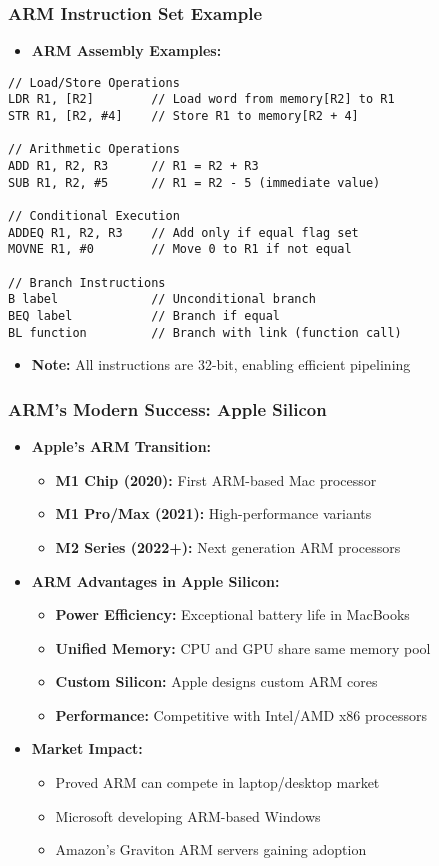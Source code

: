 \begin{frame}[fragile]
\frametitle{ARM Instruction Set Example}
\begin{itemize}
    \item \textbf{ARM Assembly Examples:}
\end{itemize}
\begin{verbatim}
// Load/Store Operations
LDR R1, [R2]        // Load word from memory[R2] to R1
STR R1, [R2, #4]    // Store R1 to memory[R2 + 4]

// Arithmetic Operations  
ADD R1, R2, R3      // R1 = R2 + R3
SUB R1, R2, #5      // R1 = R2 - 5 (immediate value)

// Conditional Execution
ADDEQ R1, R2, R3    // Add only if equal flag set
MOVNE R1, #0        // Move 0 to R1 if not equal

// Branch Instructions
B label             // Unconditional branch
BEQ label           // Branch if equal
BL function         // Branch with link (function call)
\end{verbatim}
\begin{itemize}
    \item \textbf{Note:} All instructions are 32-bit, enabling efficient pipelining
\end{itemize}
\end{frame}

\begin{frame}
\frametitle{ARM's Modern Success: Apple Silicon}
\begin{itemize}
    \item \textbf{Apple's ARM Transition:}
    \begin{itemize}
        \item \textbf{M1 Chip (2020):} First ARM-based Mac processor
        \item \textbf{M1 Pro/Max (2021):} High-performance variants
        \item \textbf{M2 Series (2022+):} Next generation ARM processors
    \end{itemize}
    \item \textbf{ARM Advantages in Apple Silicon:}
    \begin{itemize}
        \item \textbf{Power Efficiency:} Exceptional battery life in MacBooks
        \item \textbf{Unified Memory:} CPU and GPU share same memory pool
        \item \textbf{Custom Silicon:} Apple designs custom ARM cores
        \item \textbf{Performance:} Competitive with Intel/AMD x86 processors
    \end{itemize}
    \item \textbf{Market Impact:}
    \begin{itemize}
        \item Proved ARM can compete in laptop/desktop market
        \item Microsoft developing ARM-based Windows
        \item Amazon's Graviton ARM servers gaining adoption
    \end{itemize}
\end{itemize}
\end{frame}

